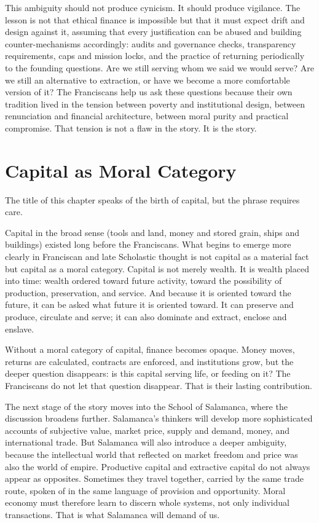 \documentclass[11pt,a4paper,oneside]{book}
\begin{document}
This ambiguity should not produce cynicism. It should produce vigilance. The lesson is not that ethical finance is impossible but that it must expect drift and design against it, assuming that every justification can be abused and building counter-mechanisms accordingly: audits and governance checks, transparency requirements, caps and mission locks, and the practice of returning periodically to the founding questions. Are we still serving whom we said we would serve? Are we still an alternative to extraction, or have we become a more comfortable version of it? The Franciscans help us ask these questions because their own tradition lived in the tension between poverty and institutional design, between renunciation and financial architecture, between moral purity and practical compromise. That tension is not a flaw in the story. It is the story.

\section*{Capital as Moral Category}

The title of this chapter speaks of the birth of capital, but the phrase requires care.

Capital in the broad sense (tools and land, money and stored grain, ships and buildings) existed long before the Franciscans. What begins to emerge more clearly in Franciscan and late Scholastic thought is not capital as a material fact but capital as a moral category. Capital is not merely wealth. It is wealth placed into time: wealth ordered toward future activity, toward the possibility of production, preservation, and service. And because it is oriented toward the future, it can be asked what future it is oriented toward. It can preserve and produce, circulate and serve; it can also dominate and extract, enclose and enslave.

Without a moral category of capital, finance becomes opaque. Money moves, returns are calculated, contracts are enforced, and institutions grow, but the deeper question disappears: is this capital serving life, or feeding on it? The Franciscans do not let that question disappear. That is their lasting contribution.

The next stage of the story moves into the School of Salamanca, where the discussion broadens further. Salamanca's thinkers will develop more sophisticated accounts of subjective value, market price, supply and demand, money, and international trade. But Salamanca will also introduce a deeper ambiguity, because the intellectual world that reflected on market freedom and price was also the world of empire. Productive capital and extractive capital do not always appear as opposites. Sometimes they travel together, carried by the same trade route, spoken of in the same language of provision and opportunity. Moral economy must therefore learn to discern whole systems, not only individual transactions. That is what Salamanca will demand of us.
\end{document}
